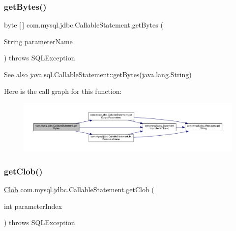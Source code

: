 \subsubsection{\texorpdfstring{get\+Bytes()}{getBytes()}\hspace{0.1cm}{\footnotesize\ttfamily [2/2]}}
{\footnotesize\ttfamily byte \mbox{[}$\,$\mbox{]} com.\+mysql.\+jdbc.\+Callable\+Statement.\+get\+Bytes (\begin{DoxyParamCaption}\item[{String}]{parameter\+Name }\end{DoxyParamCaption}) throws S\+Q\+L\+Exception}

\begin{DoxySeeAlso}{See also}
java.\+sql.\+Callable\+Statement\+::get\+Bytes(java.\+lang.\+String) 
\end{DoxySeeAlso}
Here is the call graph for this function\+:\nopagebreak
\begin{figure}[H]
\begin{center}
\leavevmode
\includegraphics[width=350pt]{classcom_1_1mysql_1_1jdbc_1_1_callable_statement_aaee5dbe4c81955ef3696f2b99b41f24b_cgraph}
\end{center}
\end{figure}
\mbox{\label{classcom_1_1mysql_1_1jdbc_1_1_callable_statement_a86bdc2b6cf993a96d55207239dfbfb86}} 
\subsubsection{\texorpdfstring{get\+Clob()}{getClob()}\hspace{0.1cm}{\footnotesize\ttfamily [1/2]}}
{\footnotesize\ttfamily \mbox{\hyperlink{classcom_1_1mysql_1_1jdbc_1_1_clob}{Clob}} com.\+mysql.\+jdbc.\+Callable\+Statement.\+get\+Clob (\begin{DoxyParamCaption}\item[{int}]{parameter\+Index }\end{DoxyParamCaption}) throws S\+Q\+L\+Exception}


